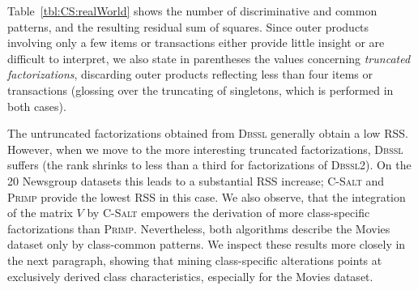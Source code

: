 Table~\ref{tbl:CS:realWorld} shows the number of discriminative and common patterns, and the resulting residual sum of squares. Since outer products involving only a few items or transactions either provide little insight or are difficult to interpret, we also state in parentheses the values concerning \textit{truncated factorizations}, discarding outer products reflecting less than four items or transactions (glossing over the truncating of singletons, which is performed in both cases).

The untruncated factorizations obtained from \textsc{Dbssl} generally obtain a low RSS. However, when we move to the more interesting truncated factorizations, \textsc{Dbssl} suffers (the rank shrinks to less than a third for factorizations of \textsc{Dbssl2}). On the 20 Newsgroup datasets this leads to a substantial RSS increase; \textsc{C-Salt} and \textsc{Primp} provide the lowest RSS in this case. We also observe, that the integration of the matrix $V$ by \textsc{C-Salt} empowers the derivation of more class-specific factorizations than \textsc{Primp}. Nevertheless, both algorithms describe the Movies dataset only by class-common patterns. We inspect these results more closely in the next paragraph, showing that mining class-specific alterations points at exclusively derived class characteristics, especially for the Movies dataset.  
%
